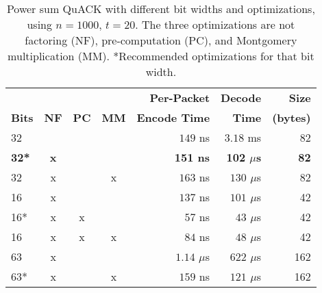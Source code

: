 \begin{table}[ht]
  \centering
  \begin{tabular}{lcccrrr}
    \toprule
    \bf     & \bf        & \bf       & \bf        & \bf Per-Packet & \bf Decode & \bf Size\\
    \bf Bits  & \bf NF     & \bf PC    & \bf MM     & \bf Encode Time & \bf Time     & \bf (bytes)\\
    \midrule
    32     &        &       &        & $149$ ns & $3.18$ ms      & 82 \\
    \bf \textcolor{black!50!blue}{32*} & \bf \textcolor{black!50!blue}{x} & & & \bf \textcolor{black!50!blue}{151 ns} & \bf \textcolor{black!50!blue}{102 ${\mu}$s} & \bf \textcolor{black!50!blue}{82} \\
    32     & x      &       & x      & $163$ ns & $130$ ${\mu}$s & 82 \\
    16     & x      &       &        & $137$ ns & $101$ ${\mu}$s & 42 \\
    16*    & x      & x     &        & $57$ ns & $43$ ${\mu}$s & 42 \\
    16     & x      & x     & x      & $84$ ns & $48$ ${\mu}$s & 42 \\
    63     & x      &       &        & $1.14$ ${\mu}$s & $622$ ${\mu}$s & 162 \\
    63*    & x      &       & x      & $159$ ns & $121$ ${\mu}$s & 162 \\
    \bottomrule
  \end{tabular}
  \caption{Power sum QuACK with different bit widths and optimizations,
  using $n=1000$, $t=20$. The three optimizations are not factoring (NF),
  pre-computation (PC), and Montgomery multiplication (MM).
  *Recommended optimizations for that bit width.}
  \label{tab:optimized-quack}
\end{table}
